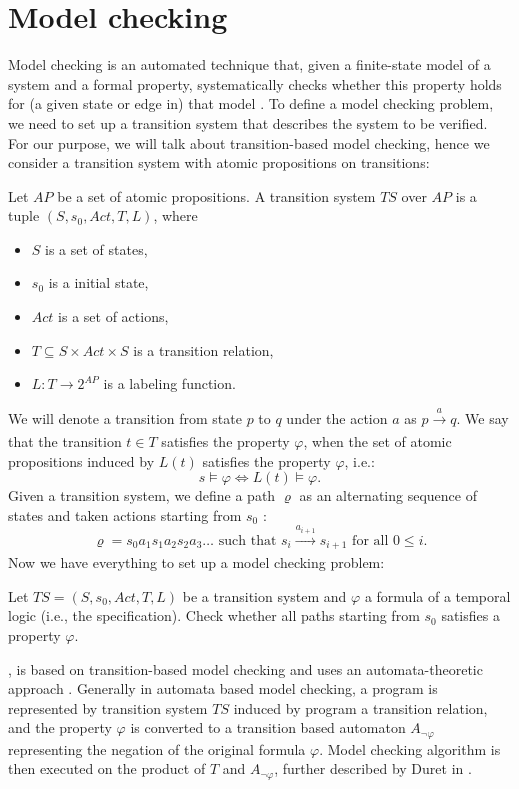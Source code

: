 \section{Model checking} \label{sec:mc}
Model checking is an automated technique that, given a finite-state model of a
system and a formal property, systematically checks whether this property holds
for (a given state or edge in) that model \cite{Baier08}. To define a model checking problem,
we need to set up a transition system that describes the system to be
verified. For our purpose, we will talk about transition-based model checking,
hence we consider a transition system with atomic propositions on transitions:
\begin{definition}\label{def:ts}
Let $AP$ be a set of atomic propositions. A transition system $TS$ over $AP$ is
a tuple $(S, s_0, Act, T, L)$, where
\begin{itemize}
    \item $S$ is a set of states,
    \item $s_0$ is a initial state,
    \item $Act$ is a set of actions,
    \item $T \subseteq S \times Act \times S$ is a
    transition relation,
    \item $L \colon T \rightarrow 2^{AP}$ is a labeling function.
\end{itemize}
\end{definition}
\noindent
We will denote a transition from state $p$ to $q$ under the action $a$ as $p \xrightarrow[]{a} q$.
We say that the transition $t \in T$ satisfies the property $\varphi$, when the set of
atomic propositions induced by $L(t)$ satisfies the property $\varphi$, i.e.:
\[ s \models \varphi \iff L(t) \models \varphi.\]
Given a transition system, we define a path $\varrho$ as an alternating sequence of
states and taken actions starting from $s_0$ \cite{Baier08}:
\[
    \varrho = s_0 a_1 s_1 a_2 s_2 a_3 \dots \text{ such that } s_i
    \xrightarrow[]{a_{i+1}} s_{i+1} \text{ for all } 0 \leq i.
\]
Now we have everything to set up a model checking problem:

\begin{definition}\label{def:mc}
Let $TS = (S, s_0, Act, T, L)$ be a transition system and $\varphi$ a
formula of a temporal logic (i.e., the specification). Check whether all
paths starting from $s_0$ satisfies a property $\varphi$.
\end{definition}

\DIVINE, is based on transition-based model checking and uses an
automata-theoretic approach \cite{Vardi96}. Generally in automata based model checking,
a program is represented by transition system $TS$ induced by program
a transition relation, and the property $\varphi$ is converted to a transition based
automaton $A_{\neg \varphi}$ representing the negation of the original formula
$\varphi$. Model checking algorithm is then executed on the product
of $T$ and $A_{\neg \varphi}$, further described by Duret in \cite{Duret04}.

